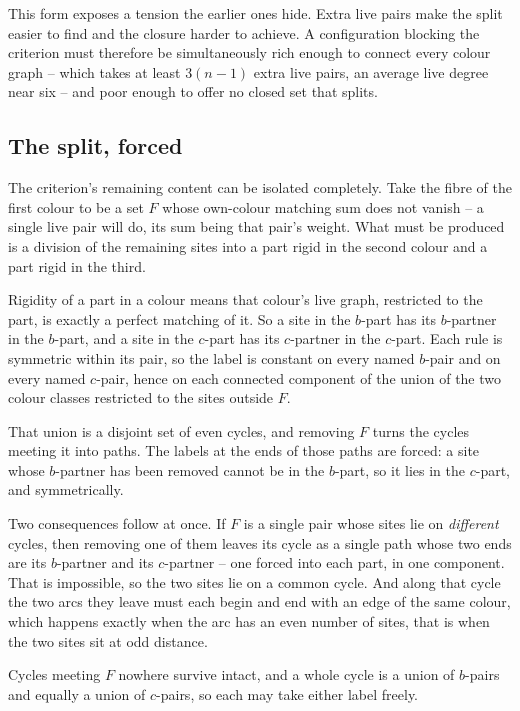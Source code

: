 \documentclass[11pt]{article}
\theoremstyle{definition}
\theoremstyle{remark}
\begin{document}
This form exposes a tension the earlier ones hide.  Extra live pairs make the split easier to find
and the closure harder to achieve.  A configuration blocking the criterion must therefore be
simultaneously rich enough to connect every colour graph -- which takes at least $3(n-1)$ extra live
pairs, an average live degree near six -- and poor enough to offer no closed set that splits.

\subsection*{The split, forced}

The criterion's remaining content can be isolated completely.  Take the fibre of the first colour to
be a set $F$ whose own-colour matching sum does not vanish -- a single live pair will do, its sum
being that pair's weight.  What must be produced is a division of the remaining sites into a part
rigid in the second colour and a part rigid in the third.

Rigidity of a part in a colour means that colour's live graph, restricted to the part, is exactly a
perfect matching of it.  So a site in the $b$-part has its $b$-partner in the $b$-part, and a site in
the $c$-part has its $c$-partner in the $c$-part.  Each rule is symmetric within its pair, so the
label is constant on every named $b$-pair and on every named $c$-pair, hence on each connected
component of the union of the two colour classes restricted to the sites outside $F$.

That union is a disjoint set of even cycles, and removing $F$ turns the cycles meeting it into paths.
The labels at the ends of those paths are forced: a site whose $b$-partner has been removed cannot be
in the $b$-part, so it lies in the $c$-part, and symmetrically.

Two consequences follow at once.  If $F$ is a single pair whose sites lie on \emph{different} cycles,
then removing one of them leaves its cycle as a single path whose two ends are its $b$-partner and its
$c$-partner -- one forced into each part, in one component.  That is impossible, so the two sites lie
on a common cycle.  And along that cycle the two arcs they leave must each begin and end with an edge
of the same colour, which happens exactly when the arc has an even number of sites, that is when the
two sites sit at odd distance.

Cycles meeting $F$ nowhere survive intact, and a whole cycle is a union of $b$-pairs and equally a
union of $c$-pairs, so each may take either label freely.
\end{document}
